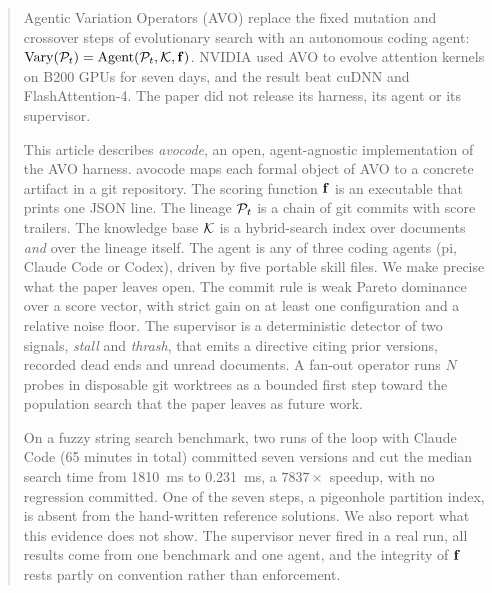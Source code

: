 \begin{abstract}
Agentic Variation Operators (AVO) replace the fixed mutation and crossover steps of evolutionary
search with an autonomous coding agent: $\Vary(\Pt) = \Agent(\Pt, \K, \f)$. NVIDIA used AVO to
evolve attention kernels on B200 GPUs for seven days, and the result beat cuDNN and
FlashAttention-4. The paper did not release its harness, its agent or its supervisor.

This article describes \emph{avocode}, an open, agent-agnostic implementation of the AVO harness.
avocode maps each formal object of AVO to a concrete artifact in a git repository. The scoring
function $\f$ is an executable that prints one JSON line. The lineage $\Pt$ is a chain of git commits
with score trailers. The knowledge base $\K$ is a hybrid-search index over documents \emph{and} over
the lineage itself. The agent is any of three coding agents (pi, Claude Code or Codex), driven by
five portable skill files. We make precise what the paper leaves open. The commit rule is weak
Pareto dominance over a score vector, with strict gain on at least one configuration and a
relative noise floor. The supervisor is a deterministic detector of two signals, \emph{stall} and
\emph{thrash}, that emits a directive citing prior versions, recorded dead ends and unread
documents. A fan-out operator runs $N$ probes in disposable git worktrees as a bounded first step
toward the population search that the paper leaves as future work.

On a fuzzy string search benchmark, two runs of the loop with Claude Code (65 minutes in total)
committed seven versions and cut the median search time from \SI{1810}{ms} to \SI{0.231}{ms}, a
$7837\times$ speedup, with no regression committed. One of the seven steps, a pigeonhole partition
index, is absent from the hand-written reference solutions. We also report what this evidence does
not show. The supervisor never fired in a real run, all results come from one benchmark and one
agent, and the integrity of $\f$ rests partly on convention rather than enforcement.
\end{abstract}
